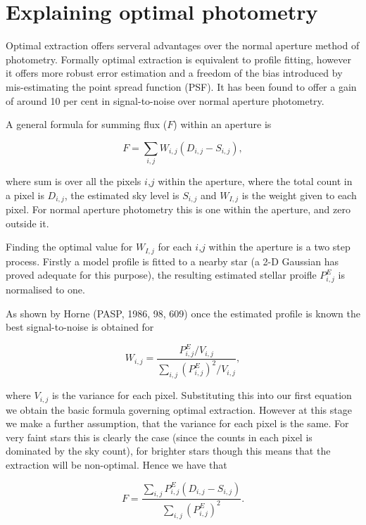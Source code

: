 \documentclass[twoside,11pt]{article}
\newcommand{\htmladdnormallink}[2]{#1}
\newcommand{\xlabel}[1]{}
\renewcommand{\_}{\texttt{\symbol{95}}}
\begin{document}
\section{\xlabel{Explaining_optimal_photometry}Explaining \xlabel{explaining}\label{explaining}optimal photometry}

Optimal extraction offers serveral advantages over the normal aperture 
method of photometry. Formally optimal extraction is equivalent to profile
fitting, however it offers more robust error estimation and a freedom of
the bias introduced by mis-estimating the point spread function (PSF). It has been found to offer a gain of around 10 per cent in signal-to-noise over normal aperture photometry.

A general formula for summing flux ($F$) within an aperture is

\[F=\sum_{i,j}W_{i,j}(D_{i,j}-S_{i,j}),\]

where sum is over all the pixels $i$,$j$ within the aperture, where the total
count in a pixel is $D_{i,j}$, the estimated sky level is $S_{i,j}$ and $W_{I,j}$ is the weight given to each pixel. For normal aperture photometry
this is one within the aperture, and zero outside it.

Finding the optimal value for $W_{I,j}$ for each $i$,$j$ within the aperture is a two step process. Firstly a model profile is fitted to a nearby star (a 2-D Gaussian has proved adequate for this purpose), the resulting estimated stellar proifle $P_{i,j}^{E}$ is normalised to one.

As shown by Horne (\htmladdnormallink{PASP, 1986, 98, 609}{http://cdsads.u-strasbg.fr/cgi-bin/nph-bib_query?bibcode=1986PASP...98..609H&db_key=AST&nosetcookie=1&high=375ea70ad608221}) once the estimated profile is known the best signal-to-noise is obtained for

\[W_{i,j}=\frac{P_{i,j}^{E}/V_{i,j}}{\sum_{i,j}(P_{i,j}^{E})^2/V_{i,j}},\]

where $V_{i,j}$ is the variance for each pixel. Substituting this into our
first equation we obtain the basic formula governing optimal extraction. However at this stage we make a further assumption, that the variance for each pixel is the same. For very faint stars this is clearly the case (since the counts in each pixel is dominated by the sky count), for brighter stars though this means that the extraction will be non-optimal. Hence we have that

\[F=\frac{\sum_{i,j}P_{i,j}^{E}(D_{i,j}-S_{i,j})}{\sum_{i,j}(P_{i,j}^{E})^2}.\]
\end{document}
